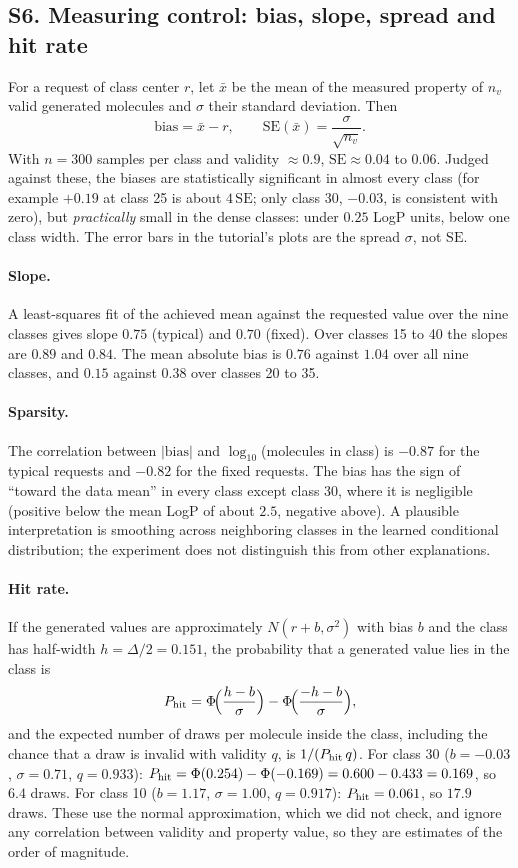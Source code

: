 \documentclass[11pt]{article}
\begin{document}
\label{sec:S6}
\subsection*{S6. Measuring control: bias, slope, spread and hit rate}
For a request of class center $r$, let $\bar x$ be the mean of the measured property of $n_v$ valid generated molecules and $\sigma$ their standard deviation. Then
\[
  \text{bias}=\bar x-r,\qquad \mathrm{SE}(\bar x)=\frac{\sigma}{\sqrt{n_v}} .
\]
With $n=300$ samples per class and validity $\approx0.9$, $\mathrm{SE}\approx0.04$ to $0.06$. Judged against these, the biases are statistically significant in almost every class (for example $+0.19$ at class 25 is about $4\,\mathrm{SE}$; only class 30, $-0.03$, is consistent with zero), but \emph{practically} small in the dense classes: under $0.25$ LogP units, below one class width. The error bars in the tutorial's plots are the spread $\sigma$, not $\mathrm{SE}$.

\paragraph{Slope.} A least-squares fit of the achieved mean against the requested value over the nine classes gives slope $0.75$ (typical) and $0.70$ (fixed). Over classes 15 to 40 the slopes are $0.89$ and $0.84$. The mean absolute bias is $0.76$ against $1.04$ over all nine classes, and $0.15$ against $0.38$ over classes 20 to 35.

\paragraph{Sparsity.} The correlation between $|\text{bias}|$ and $\log_{10}$(molecules in class) is $-0.87$ for the typical requests and $-0.82$ for the fixed requests. The bias has the sign of ``toward the data mean'' in every class except class 30, where it is negligible (positive below the mean LogP of about $2.5$, negative above). A plausible interpretation is smoothing across neighboring classes in the learned conditional distribution; the experiment does not distinguish this from other explanations.

\paragraph{Hit rate.} If the generated values are approximately $N(r+b,\sigma^2)$ with bias $b$ and the class has half-width $h=\Delta/2=0.151$, the probability that a generated value lies in the class is
\[
  P_{\rm hit}=\Phi\!\Big(\frac{h-b}{\sigma}\Big)-\Phi\!\Big(\frac{-h-b}{\sigma}\Big),
\]
and the expected number of draws per molecule inside the class, including the chance that a draw is invalid with validity $q$, is $1/(P_{\rm hit}\,q)$. For class 30 ($b=-0.03$, $\sigma=0.71$, $q=0.933$): $P_{\rm hit}=\Phi(0.254)-\Phi(-0.169)=0.600-0.433=0.169$, so $6.4$ draws. For class 10 ($b=1.17$, $\sigma=1.00$, $q=0.917$): $P_{\rm hit}=0.061$, so $17.9$ draws. These use the normal approximation, which we did not check, and ignore any correlation between validity and property value, so they are estimates of the order of magnitude.
\end{document}
